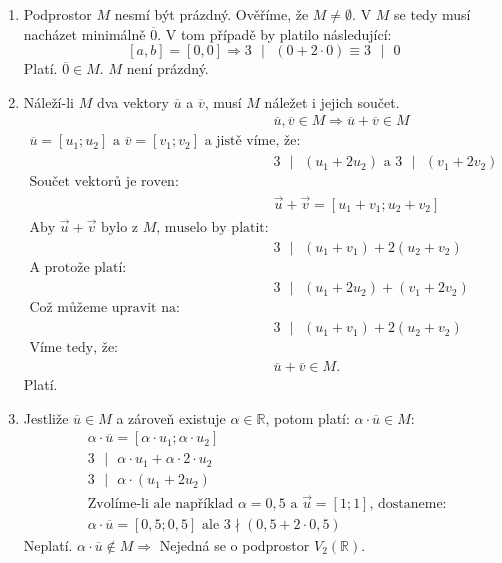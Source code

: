 \documentclass[12pt,a4paper]{article}
\begin{document}
\begin{enumerate}
    \item Podprostor $M$ nesmí být prázdný. Ověříme, že $M \neq \emptyset$.
    V $M$ se tedy musí nacházet minimálně $\overline{0}$. V tom případě by platilo následující:
    $$[a, b] = [0, 0] \Rightarrow 3\text{ }|\text{ }(0 + 2 \cdot 0) \equiv 3\text{ }|\text{ }0$$ Platí. $\overline{0} \in M$. $M$ není prázdný.
    
    \item Náleží-li $M$ dva vektory $\overline{u}$ a $\overline{v}$, musí $M$ náležet i jejich součet.
    \begin{align*}
        &\overline{u}, \overline{v} \in M \Rightarrow \overline{u} + \overline{v} \in M \\
        \overline{u} = [u_1; u_2] \text{ a } \overline{v} = [v_1; v_2] \text{ a jistě víme, že: } \\
        &3\text{ }|\text{ } (u_1 + 2u_2) \text{ a } 3 \text{ }|\text{ } (v_1 + 2v_2) \\
        \text{Součet vektorů je roven:} \\
        &\vec{u} + \vec{v} = [u_1 + v_1; u_2 + v_2] \\
        \text{Aby } \vec{u} + \vec{v} \text{ bylo z } M \text{, muselo by platit: } \\
        &3 \text{ }|\text{ } (u_1 + v_1) + 2(u_2 + v_2) \\
        \text{A protože platí: } \\
        &3 \text{ }|\text{ } (u_1 + 2u_2) +  (v_1 + 2v_2) \\
        \text{Což můžeme upravit na: } \\
        &3 \text{ }|\text{ } (u_1 + v_1) + 2(u_2 + v_2) \\
        \text{Víme tedy, že: } \\ 
        &\overline{u} + \overline{v} \in M\text{.}
    \end{align*}
    Platí.
    
    
    
    \item Jestliže $\overline{u}\in M$ a zároveň existuje $\alpha \in \mathbb{R}$, potom platí: $\alpha \cdot \overline{u} \in M$: 
    \begin{align*}
        &\alpha \cdot \overline{u} = [\alpha \cdot u_1; \alpha \cdot u_2] \\
        &3 \text{ }|\text{ } \alpha \cdot u_1 + \alpha \cdot 2 \cdot u_2 \\
        &3 \text{ }|\text{ } \alpha \cdot (u_1 + 2u_2) \\
        &\text{Zvolíme-li ale například $\alpha = 0,5$ a $\vec{u} = [1; 1]$, dostaneme: } \\
        &\alpha \cdot \overline{u} = [0,5; 0,5] \text{ ale } 3 \nmid (0,5 + 2 \cdot 0,5) 
    \end{align*}
    Neplatí. $\alpha \cdot \overline{u} \notin M \Rightarrow $ Nejedná se o podprostor $V_2(\mathbb{R})$.
\end{enumerate}
\end{document}
